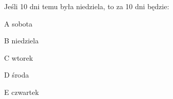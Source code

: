 \begin{tresc}
Jeśli 10 dni temu była niedziela, to za 10 dni będzie:
\end{tresc}
\begin{wariant}{A} sobota \end{wariant}
\begin{wariant}{B} niedziela \end{wariant}
\begin{wariant}{C} wtorek \end{wariant}
\begin{wariant}{D} środa \end{wariant}
\begin{wariant}{E} czwartek \end{wariant}
